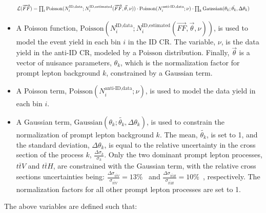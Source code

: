 \begin{equation}
  \scalebox{0.70}{$
  \mathcal{L} (\overrightarrow{FF}) = \prod_{i} \text{Poisson}(N_{i}^{\mathrm{\text{ID}, \text{data}}}; N_{i}^{\mathrm{\text{ID}, \text{estimated}}} (\overrightarrow{FF}, \vec{\theta}, \nu)) \cdot 
  \text{Poisson} (N_{i}^{\mathrm{\text{anti-ID}, \text{data}}}; \nu) \cdot 
  \prod_{k} \text{Gaussian} (\theta_{k}; \tilde{\theta_{k}}, \Delta{\theta_{k}})
  $}
  \label{eq:ff_likelihood}
\end{equation}

\begin{itemize}
  \item A Poisson function, $\text{Poisson}(N_{i}^{\text{ID}, \text{data}}; N_{i}^{\text{ID}, \text{estimated}}(\overrightarrow{FF}, \vec{\theta}, \nu))$, is used to model the event yield in each \pt{} bin $i$ in the ID CR. The variable, $\nu$, is the data yield in the anti-ID CR, modeled by a $\text{Poisson}$ distribution. Finally, $\vec{\theta}$ is a vector of nuisance parameters, $\theta_{k}$, which is the normalization factor for prompt lepton background $k$, constrained by a $\text{Gaussian}$ term.
  \item A Poisson term, $\text{Poisson}(N_{i}^{\text{anti-ID}, \text{data}}; \nu)$, is used to model the data yield in each \pt{} bin $i$.
  \item A Gaussian term, $\text{Gaussian}(\theta_{k};\tilde{\theta_{k}}, \Delta{\theta_{k}})$, is used to constrain the normalization of prompt lepton background $k$. The mean, $\tilde{\theta_{k}}$, is set to 1, and the standard deviation, $\Delta{\theta_{k}}$, is equal to the relative uncertainty in the cross section of the process $k$, $\frac{\Delta{\sigma_{k}}}{\sigma_{k}}$. Only the two dominant prompt lepton processes, $t\bar{t}V$ and $t\bar{t}H$, are constrained with the Gaussian term, with the relative cross sections uncertainties being: $\frac{\Delta{\sigma_{t\bar{t}V}}}{\sigma_{t\bar{t}V}} = 13\%$~\cite{atlas_ttV_xsec} and $\frac{\Delta{\sigma_{t\bar{t}H}}}{\sigma_{t\bar{t}H}} = 10\%$~\cite{lhchiggsxsec_ttH}, respectively. The normalization factors for all other prompt lepton processes are set to 1.
\end{itemize}

The above variables are defined such that:

